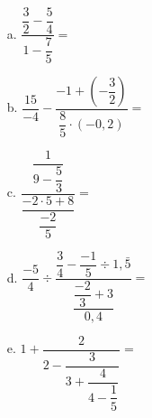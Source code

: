 \documentclass[spanish,letterpaper, 11pt, addpoints, answers]{exam}
\begin{document}
\begin{questions}
\begin{itemize}
\item[a.] $\dfrac{\dfrac{3}{2}-\dfrac{5}{4}}{1-\dfrac{7}{5}}=$
\vspace{5cm}
\item[b.] $\dfrac{15}{-4}-\dfrac{-1+\left(-\dfrac{3}{2}\right)}{\dfrac{8}{5}\cdot \left(-0{,}2\right)}=$
\vspace{5cm}
\item[c.] $\dfrac{\dfrac{1}{9-\dfrac{5}{3}}}{\dfrac{-2\cdot 5+8}{\dfrac{-2}{5}}}=$
\vspace{5cm}
\item[d.] $\dfrac{-5}{4}\div \dfrac{\dfrac{3}{4}-\dfrac{-1}{5}\div 1{,}\bar{5}}{\dfrac{\dfrac{-2}{3}+3}{0{,}4}}=$
\vspace{5cm}
\item[e.] $1+\dfrac{2}{2-\dfrac{3}{3+\dfrac{4}{4-\dfrac{1}{5}}}}=$
\vspace{5cm}
\end{itemize}

\end{questions}
\end{document}

